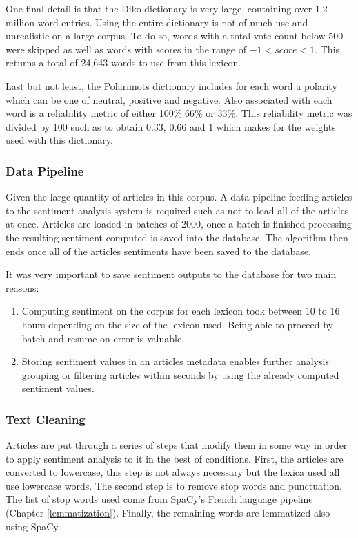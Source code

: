 One final detail is that the Diko dictionary is very large, containing over 1.2 million word entries. Using the entire dictionary is not of much use and unrealistic on a large corpus. To do so, words with a total vote count below 500 were skipped as well as words with scores in the range of $-1 < score < 1$. This returns a total of 24,643 words to use from this lexicon.

Last but not least, the Polarimots dictionary includes for each word a polarity which can be one of neutral, positive and negative. Also associated with each word is a reliability metric of either 100\% 66\% or 33\%. This reliability metric was divided by 100 such as to obtain 0.33, 0.66 and 1 which makes for the weights used with this dictionary.

\subsubsection{Data Pipeline}

Given the large quantity of articles in this corpus. A data pipeline feeding articles to the sentiment analysis system is required such as not to load all of the articles at once. Articles are loaded in batches of 2000, once a batch is finished processing the resulting sentiment computed is saved into the database. The algorithm then ends once all of the articles sentiments have been saved to the database.

It was very important to save sentiment outputs to the database for two main reasons:
\begin{enumerate}
    \item Computing sentiment on the corpus for each lexicon took between 10 to 16 hours depending on the size of the lexicon used. Being able to proceed by batch and resume on error is valuable.
    \item Storing sentiment values in an articles metadata enables further analysis grouping or filtering articles within seconds by using the already computed sentiment values.
\end{enumerate}

\subsubsection{Text Cleaning}

Articles are put through a series of steps that modify them in some way in order to apply sentiment analysis to it in the best of conditions. First, the articles are converted to lowercase, this step is not always necessary but the lexica used all use lowercase words. The second step is to remove stop words and punctuation. The list of stop words used come from SpaCy's French language pipeline (Chapter \ref{lemmatization}). Finally, the remaining words are lemmatized also using SpaCy.

